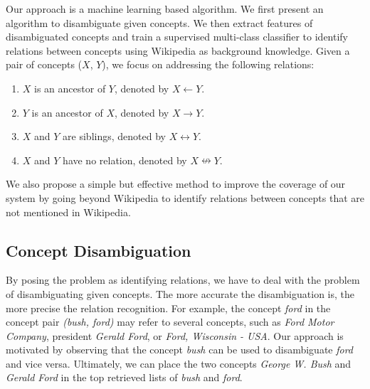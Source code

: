 Our approach is a machine learning based algorithm. We first present
an algorithm to disambiguate given concepts. We then extract features
of disambiguated concepts and train a supervised multi-class
classifier to identify relations between concepts using Wikipedia as
background knowledge. Given a pair of concepts ($X$, $Y$), we focus on
addressing the following relations:

\begin{enumerate}
\item $X$ is an ancestor of $Y$, denoted by $X \leftarrow Y$.
\item $Y$ is an ancestor of $X$, denoted by $X \rightarrow Y$.
\item $X$ and $Y$ are siblings, denoted by $X \leftrightarrow Y$.
\item $X$ and $Y$ have no relation, denoted by $X \nleftrightarrow Y$.
\end{enumerate}

We also propose a simple but effective method to improve the coverage
of our system by going beyond Wikipedia to identify relations between
concepts that are not mentioned in Wikipedia.

\subsection{Concept Disambiguation}
\label{sec:conc-disamb}


 By posing the problem as
identifying relations, we have to deal with the problem of
disambiguating given concepts. The more accurate the disambiguation
is, the more precise the relation recognition. For example, the
concept \emph{ford} in the concept pair \emph{(bush, ford)} may refer
to several concepts, such as \emph{Ford Motor Company}, president
\emph{Gerald Ford}, or \emph{Ford, Wisconsin - USA}. Our
approach is motivated by observing that the concept \emph{bush} can be
used to disambiguate \emph{ford} and vice versa. Ultimately, we can
place the two concepts \emph{George W. Bush} and \emph{Gerald Ford} in the
top retrieved lists of \emph{bush} and \emph{ford}.

